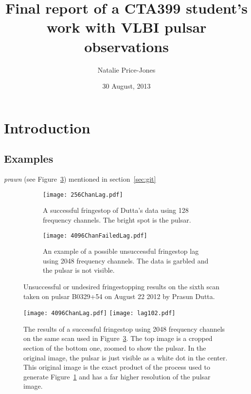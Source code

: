 \documentclass[a4paper,12pt]{article}
\begin{document}
\onehalfspacing
\title{Final report of a CTA399 student's work with VLBI pulsar observations}
\author{Natalie Price-Jones}
\date{30 August, 2013}
\maketitle

\begin{abstract}
\label{abstract}

\end{abstract}

\section{Introduction}
\label{sec:introduction}

\subsection{Examples}
\label{sec:ex}

\citep{millisecondpulsar}
\emph{prawn}
(see Figure~\ref{fig:failedFS})
mentioned in section~\ref{sec:git}

\begin{figure}
\centering
\begin{subfigure}{0.5\textwidth}
  \centering
  \texttt{[image: 256ChanLag.pdf]}
  \caption{A successful fringestop of Dutta's data using 128 frequency channels. The bright spot is the pulsar.}
  \label{fig:sub1}
\end{subfigure}%
\begin{subfigure}{0.5\textwidth}
  \centering
  \texttt{[image: 4096ChanFailedLag.pdf]}
  \caption{An example of a possible unsuccessful fringestop lag using 2048 frequency channels. The data is garbled and the pulsar is not visible.}
  \label{fig:sub2}
\end{subfigure}
\caption{Unsuccessful or undesired fringestopping results on the sixth scan taken on pulsar B0329+54 on August 22 2012 by Prasun Dutta.}
\label{fig:failedFS}
\end{figure}

\begin{figure}
\centering
\texttt{[image: 4096ChanLag.pdf]}
\texttt{[image: lag102.pdf]}
\caption{The results of a successful fringestop using 2048 frequency channels on the same scan used in Figure~\ref{fig:failedFS}. The top image is a cropped section of the bottom one, zoomed to show the pulsar. In the original image, the pulsar is just visible as a white dot in the center. This original image is the exact product of the process used to generate Figure~\ref{fig:sub1} and has a far higher resolution of the pulsar image.}
\label{fig:successfulFS}
\end{figure}
\end{document}
